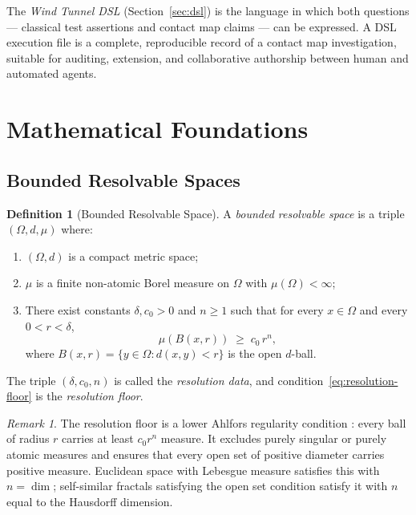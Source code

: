 \documentclass[12pt,a4paper,twocolumn]{article}
\theoremstyle{plain}
\theoremstyle{definition}
\newtheorem{definition}[theorem]{Definition}
\theoremstyle{remark}
\newtheorem{remark}[theorem]{Remark}
\newcommand{\BRS}{(\Omega,d,\mu)}
\begin{document}
The \emph{Wind Tunnel DSL} (Section~\ref{sec:dsl}) is the language in which
both questions --- classical test assertions and contact map claims --- can be
expressed.  A DSL execution file is a complete, reproducible record of a
contact map investigation, suitable for auditing, extension, and collaborative
authorship between human and automated agents.

\section{Mathematical Foundations}
\label{sec:foundations}

\subsection{Bounded Resolvable Spaces}

\begin{definition}[Bounded Resolvable Space]
\label{def:brs}
A \emph{bounded resolvable space} is a triple $\BRS$ where:
\begin{enumerate}[label=(\roman*)]
  \item $(\Omega, d)$ is a compact metric space;
  \item $\mu$ is a finite non-atomic Borel measure on $\Omega$ with
    $\mu(\Omega) < \infty$;
  \item There exist constants $\delta, c_0 > 0$ and $n \geq 1$ such that
    for every $x \in \Omega$ and every $0 < r < \delta$,
    \begin{equation}
      \mu\!\left(B(x,r)\right) \;\geq\; c_0\, r^n,
      \label{eq:resolution-floor}
    \end{equation}
    where $B(x,r) = \{y \in \Omega : d(x,y) < r\}$ is the open $d$-ball.
\end{enumerate}
The triple $(\delta, c_0, n)$ is called the \emph{resolution data}, and
condition~\eqref{eq:resolution-floor} is the \emph{resolution floor}.
\end{definition}

\begin{remark}
The resolution floor is a lower Ahlfors regularity condition
\citep{mattila1995geometry, falconer2003fractal}: every ball of radius $r$
carries at least $c_0 r^n$ measure.  It excludes purely singular or purely
atomic measures and ensures that every open set of positive diameter carries
positive measure.  Euclidean space with Lebesgue measure satisfies this with
$n = \dim$; self-similar fractals satisfying the open set condition satisfy
it with $n$ equal to the Hausdorff dimension.
\end{remark}
\end{document}
